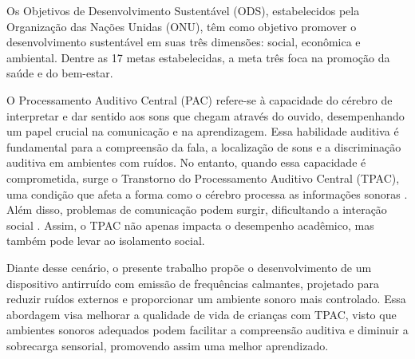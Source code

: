 Os Objetivos de Desenvolvimento Sustentável (ODS), estabelecidos pela Organização das Nações Unidas (ONU),
têm como objetivo promover o desenvolvimento sustentável em suas três dimensões: social, econômica e ambiental.
Dentre as 17 metas estabelecidas, a meta três foca na promoção da saúde e do bem-estar.

O Processamento Auditivo Central (PAC) refere-se à capacidade do cérebro de interpretar e dar sentido aos sons que chegam através do ouvido,
desempenhando um papel crucial na comunicação e na aprendizagem. Essa habilidade auditiva é fundamental para a compreensão da fala,
a localização de sons e a discriminação auditiva em ambientes com ruídos. No entanto, quando essa capacidade é comprometida,
surge o Transtorno do Processamento Auditivo Central (TPAC), uma condição que afeta a forma como o cérebro processa as informações sonoras \cite{Silva2023}.
Além disso, problemas de comunicação podem surgir, dificultando a interação social \cite{palfery2007}. Assim,
o TPAC não apenas impacta o desempenho acadêmico, mas também pode levar ao isolamento social.

Diante desse cenário, o presente trabalho propõe o desenvolvimento de um dispositivo antirruído com emissão de frequências calmantes,
projetado para reduzir ruídos externos e proporcionar um ambiente sonoro mais controlado.
Essa abordagem visa melhorar a qualidade de vida de crianças com TPAC, visto que ambientes sonoros adequados podem facilitar a compreensão auditiva
e diminuir a sobrecarga sensorial, promovendo assim uma melhor aprendizado.